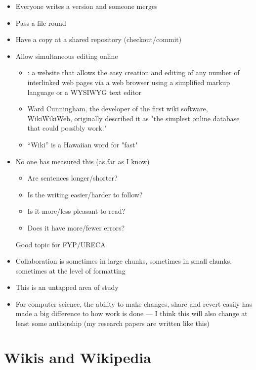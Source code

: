 \documentclass[a4paper,landscape,headrule,footrule,xetex]{foils}
\begin{document}

\begin{itemize}
\item Everyone writes a version and someone merges
\item Pass a file round
\item Have a copy at a shared repository (checkout/commit)
\item Allow simultaneous editing online
  \begin{itemize}
  \item  {}: a website that allows the easy creation and editing of any number of interlinked web pages via a web browser using a simplified markup language or a WYSIWYG text editor
  \item Ward Cunningham, the developer of the first wiki software, WikiWikiWeb, originally described it as "the simplest online database that could possibly work."
  \item ``Wiki'' is a Hawaiian word for "fast"
  \end{itemize}
\end{itemize}



\begin{itemize}
\item No one has measured this (as far as I know)
  \begin{itemize}
  \item Are sentences longer/shorter?
  \item Is the writing easier/harder to follow?
  \item Is it more/less pleasant to read?
  \item Does it have more/fewer errors?
  \end{itemize}
  Good topic for FYP/URECA 
\item Collaboration is sometimes in large chunks, sometimes in small
  chunks, sometimes at the level of formatting
\item This is an untapped area of study
\item For computer science, the ability to make changes, share and
  revert easily has made a big difference to how work is done --- I
  think this will also change at least some authorship (my research
  papers are written like this)
\end{itemize}

\section{Wikis and Wikipedia}
\end{document}
